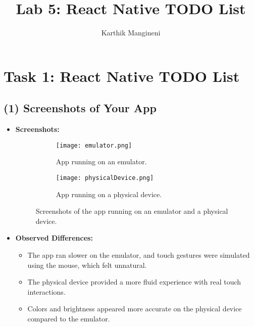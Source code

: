 \documentclass{article}
\title{Lab 5: React Native TODO List}
\author{Karthik Mangineni}
\begin{document}
\maketitle

\section*{Task 1: React Native TODO List}

\subsection*{(1) Screenshots of Your App}
\begin{itemize}
    \item \textbf{Screenshots:}
    \begin{figure}[h!]
    \centering
    \begin{subfigure}[b]{0.45\linewidth}
        \centering
        \texttt{[image: emulator.png]}
        \caption{App running on an emulator.}
        \label{fig:emulator}
    \end{subfigure}
    \hfill
    \begin{subfigure}[b]{0.45\linewidth}
        \centering
        \texttt{[image: physicalDevice.png]}
        \caption{App running on a physical device.}
        \label{fig:physical_device}
    \end{subfigure}
    \caption{Screenshots of the app running on an emulator and a physical device.}
    \label{fig:app_screenshots}
    \end{figure}
    \item \textbf{Observed Differences:}
    \begin{itemize}
        \item The app ran slower on the emulator, and touch gestures were simulated using the mouse, which felt unnatural.
        \item The physical device provided a more fluid experience with real touch interactions.
        \item Colors and brightness appeared more accurate on the physical device compared to the emulator.
    \end{itemize}
\end{itemize}
\end{document}
